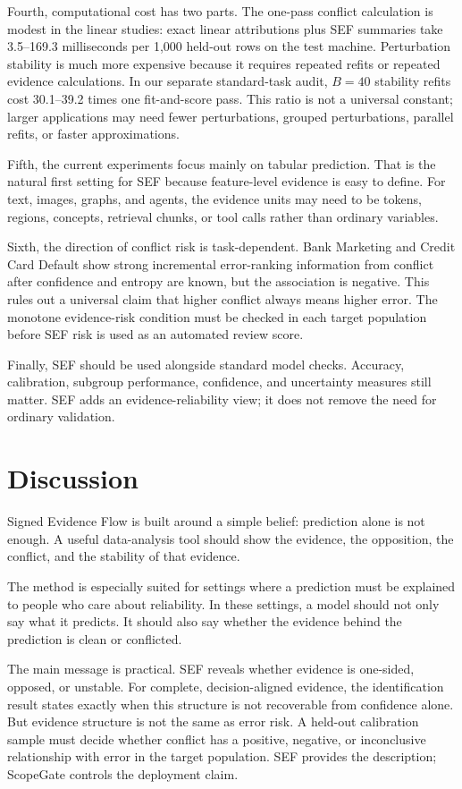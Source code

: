 \documentclass[11pt]{article}
\begin{document}
Fourth, computational cost has two parts. The one-pass conflict calculation is modest in the linear studies: exact linear attributions plus SEF summaries take 3.5--169.3 milliseconds per 1,000 held-out rows on the test machine. Perturbation stability is much more expensive because it requires repeated refits or repeated evidence calculations. In our separate standard-task audit, $B=40$ stability refits cost 30.1--39.2 times one fit-and-score pass. This ratio is not a universal constant; larger applications may need fewer perturbations, grouped perturbations, parallel refits, or faster approximations.

Fifth, the current experiments focus mainly on tabular prediction. That is the natural first setting for SEF because feature-level evidence is easy to define. For text, images, graphs, and agents, the evidence units may need to be tokens, regions, concepts, retrieval chunks, or tool calls rather than ordinary variables.

Sixth, the direction of conflict risk is task-dependent. Bank Marketing and Credit Card Default show strong incremental error-ranking information from conflict after confidence and entropy are known, but the association is negative. This rules out a universal claim that higher conflict always means higher error. The monotone evidence-risk condition must be checked in each target population before SEF risk is used as an automated review score.

Finally, SEF should be used alongside standard model checks. Accuracy, calibration, subgroup performance, confidence, and uncertainty measures still matter. SEF adds an evidence-reliability view; it does not remove the need for ordinary validation.

\section{Discussion}

Signed Evidence Flow is built around a simple belief: prediction alone is not enough. A useful data-analysis tool should show the evidence, the opposition, the conflict, and the stability of that evidence.

The method is especially suited for settings where a prediction must be explained to people who care about reliability. In these settings, a model should not only say what it predicts. It should also say whether the evidence behind the prediction is clean or conflicted.

The main message is practical. SEF reveals whether evidence is one-sided,
opposed, or unstable. For complete, decision-aligned evidence, the
identification result states exactly when this structure is not recoverable
from confidence alone. But evidence structure is not the same as error risk. A
held-out calibration sample must decide whether conflict has a positive,
negative, or inconclusive relationship with error in the target population.
SEF provides the description; ScopeGate controls the deployment claim.
\end{document}
